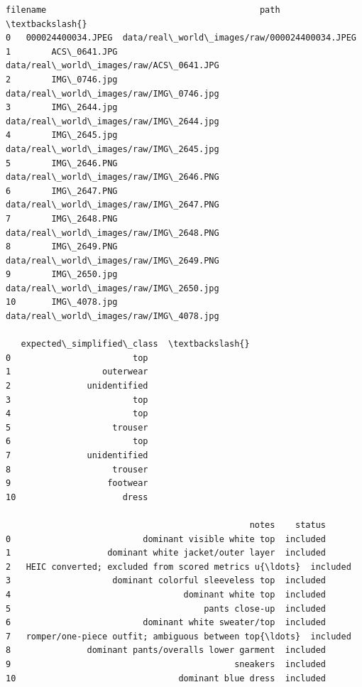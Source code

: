 \documentclass[11pt]{article}
\begin{document}
    
    \begin{Verbatim}[commandchars=\\\{\}]
             filename                                          path  \textbackslash{}
0   000024400034.JPEG  data/real\_world\_images/raw/000024400034.JPEG   
1        ACS\_0641.JPG       data/real\_world\_images/raw/ACS\_0641.JPG   
2        IMG\_0746.jpg       data/real\_world\_images/raw/IMG\_0746.jpg   
3        IMG\_2644.jpg       data/real\_world\_images/raw/IMG\_2644.jpg   
4        IMG\_2645.jpg       data/real\_world\_images/raw/IMG\_2645.jpg   
5        IMG\_2646.PNG       data/real\_world\_images/raw/IMG\_2646.PNG   
6        IMG\_2647.PNG       data/real\_world\_images/raw/IMG\_2647.PNG   
7        IMG\_2648.PNG       data/real\_world\_images/raw/IMG\_2648.PNG   
8        IMG\_2649.PNG       data/real\_world\_images/raw/IMG\_2649.PNG   
9        IMG\_2650.jpg       data/real\_world\_images/raw/IMG\_2650.jpg   
10       IMG\_4078.jpg       data/real\_world\_images/raw/IMG\_4078.jpg   

   expected\_simplified\_class  \textbackslash{}
0                        top   
1                  outerwear   
2               unidentified   
3                        top   
4                        top   
5                    trouser   
6                        top   
7               unidentified   
8                    trouser   
9                   footwear   
10                     dress   

                                                notes    status  
0                          dominant visible white top  included  
1                   dominant white jacket/outer layer  included  
2   HEIC converted; excluded from scored metrics u{\ldots}  included  
3                    dominant colorful sleeveless top  included  
4                                  dominant white top  included  
5                                      pants close-up  included  
6                          dominant white sweater/top  included  
7   romper/one-piece outfit; ambiguous between top{\ldots}  included  
8               dominant pants/overalls lower garment  included  
9                                            sneakers  included  
10                                dominant blue dress  included  
    \end{Verbatim}
\end{document}
